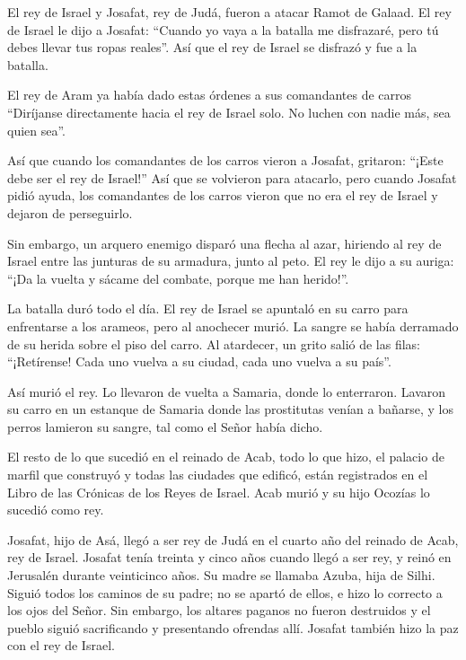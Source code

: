  El rey de Israel y Josafat, rey de Judá, fueron a atacar
Ramot de Galaad.  El rey de Israel le dijo a Josafat:
``Cuando yo vaya a la batalla me disfrazaré, pero tú debes llevar tus
ropas reales''. Así que el rey de Israel se disfrazó y fue a la batalla.

 El rey de Aram ya había dado estas órdenes a sus
comandantes de carros ``Diríjanse directamente hacia el rey de Israel
solo. No luchen con nadie más, sea quien sea''.

 Así que cuando los comandantes de los carros vieron a
Josafat, gritaron: ``¡Este debe ser el rey de Israel!'' Así que se
volvieron para atacarlo, pero cuando Josafat pidió ayuda, 
los comandantes de los carros vieron que no era el rey de Israel y
dejaron de perseguirlo.

 Sin embargo, un arquero enemigo disparó una flecha al
azar, hiriendo al rey de Israel entre las junturas de su armadura, junto
al peto. El rey le dijo a su auriga: ``¡Da la vuelta y sácame del
combate, porque me han herido!''.

 La batalla duró todo el día. El rey de Israel se apuntaló
en su carro para enfrentarse a los arameos, pero al anochecer murió. La
sangre se había derramado de su herida sobre el piso del carro.
 Al atardecer, un grito salió de las filas: ``¡Retírense!
Cada uno vuelva a su ciudad, cada uno vuelva a su país''.

 Así murió el rey. Lo llevaron de vuelta a Samaria, donde
lo enterraron.  Lavaron su carro en un estanque de Samaria
donde las prostitutas venían a bañarse, y los perros lamieron su sangre,
tal como el Señor había dicho.

 El resto de lo que sucedió en el reinado de Acab, todo lo
que hizo, el palacio de marfil que construyó y todas las ciudades que
edificó, están registrados en el Libro de las Crónicas de los Reyes de
Israel.  Acab murió y su hijo Ocozías lo sucedió como rey.

 Josafat, hijo de Asá, llegó a ser rey de Judá en el cuarto
año del reinado de Acab, rey de Israel.  Josafat tenía
treinta y cinco años cuando llegó a ser rey, y reinó en Jerusalén
durante veinticinco años. Su madre se llamaba Azuba, hija de Silhi.
 Siguió todos los caminos de su padre; no se apartó de
ellos, e hizo lo correcto a los ojos del Señor. Sin embargo, los altares
paganos no fueron destruidos y el pueblo siguió sacrificando y
presentando ofrendas allí.  Josafat también hizo la paz con
el rey de Israel.

